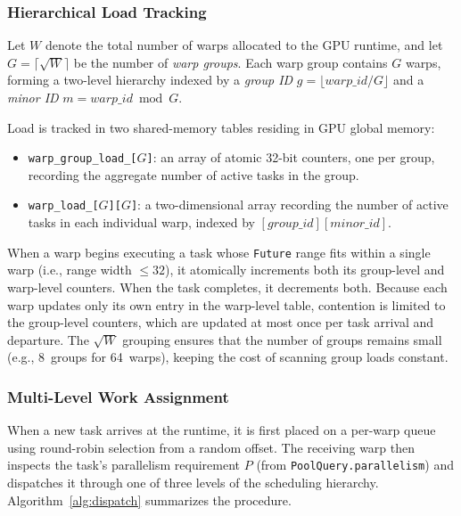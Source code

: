 \subsubsection{Hierarchical Load Tracking}
\label{sec:load-tracking}

Let $W$ denote the total number of warps allocated to the GPU
runtime, and let $G = \lceil\sqrt{W}\rceil$ be the number of
\emph{warp groups}.  Each warp group contains $G$ warps, forming
a two-level hierarchy indexed by a \emph{group ID}
$g = \lfloor\mathit{warp\_id} / G\rfloor$ and a \emph{minor ID}
$m = \mathit{warp\_id} \bmod G$.

Load is tracked in two shared-memory tables residing in GPU global
memory:

\begin{itemize}[nosep]
  \item \texttt{warp\_group\_load\_[$G$]}:
    an array of atomic 32-bit counters, one per group, recording
    the aggregate number of active tasks in the group.
  \item \texttt{warp\_load\_[$G$][$G$]}:
    a two-dimensional array recording the number of active tasks
    in each individual warp, indexed by
    $[\mathit{group\_id}][\mathit{minor\_id}]$.
\end{itemize}

\noindent
When a warp begins executing a task whose \texttt{Future} range
fits within a single warp (i.e., range width $\leq 32$), it
atomically increments both its group-level and warp-level counters.
When the task completes, it decrements both.
Because each warp updates only its own entry in the warp-level
table, contention is limited to the group-level counters, which
are updated at most once per task arrival and departure.
The $\sqrt{W}$ grouping ensures that the number of groups remains
small (e.g., 8~groups for 64~warps), keeping the cost of scanning
group loads constant.

\subsubsection{Multi-Level Work Assignment}
\label{sec:work-assign}

When a new task arrives at the runtime, it is first placed on a
per-warp queue using round-robin selection from a random offset.
The receiving warp then inspects the task's parallelism requirement
$P$ (from \texttt{PoolQuery.parallelism}) and dispatches it through
one of three levels of the scheduling hierarchy.
Algorithm~\ref{alg:dispatch} summarizes the procedure.


